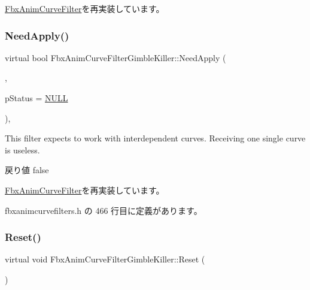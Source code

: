 \hyperlink{class_fbx_anim_curve_filter_a6b210eca45b745cf070c46bfaaf3e5b2}{Fbx\+Anim\+Curve\+Filter}を再実装しています。

\mbox{\label{class_fbx_anim_curve_filter_gimble_killer_a136dadcee53ebed6b5afc6abddfcf402}} 
\subsubsection{\texorpdfstring{Need\+Apply()}{NeedApply()}\hspace{0.1cm}{\footnotesize\ttfamily [5/5]}}
{\footnotesize\ttfamily virtual bool Fbx\+Anim\+Curve\+Filter\+Gimble\+Killer\+::\+Need\+Apply (\begin{DoxyParamCaption}\item[{\hyperlink{class_fbx_anim_curve}{Fbx\+Anim\+Curve} \&}]{,  }\item[{\hyperlink{class_fbx_status}{Fbx\+Status} $\ast$}]{p\+Status = {\ttfamily \hyperlink{fbxarch_8h_a070d2ce7b6bb7e5c05602aa8c308d0c4}{N\+U\+LL}} }\end{DoxyParamCaption})\hspace{0.3cm}{\ttfamily [inline]}, {\ttfamily [virtual]}}

This filter expects to work with interdependent curves. Receiving one single curve is useless. \begin{DoxyReturn}{戻り値}
{\ttfamily false} 
\end{DoxyReturn}


\hyperlink{class_fbx_anim_curve_filter_af768a9c47e4f5a5fff47a8ec781e6b4c}{Fbx\+Anim\+Curve\+Filter}を再実装しています。



 fbxanimcurvefilters.\+h の 466 行目に定義があります。

\mbox{\label{class_fbx_anim_curve_filter_gimble_killer_ad0c8bbf400bc208412b088d9c5b702a5}} 
\subsubsection{\texorpdfstring{Reset()}{Reset()}}
{\footnotesize\ttfamily virtual void Fbx\+Anim\+Curve\+Filter\+Gimble\+Killer\+::\+Reset (\begin{DoxyParamCaption}{ }\end{DoxyParamCaption})\hspace{0.3cm}{\ttfamily [virtual]}}

